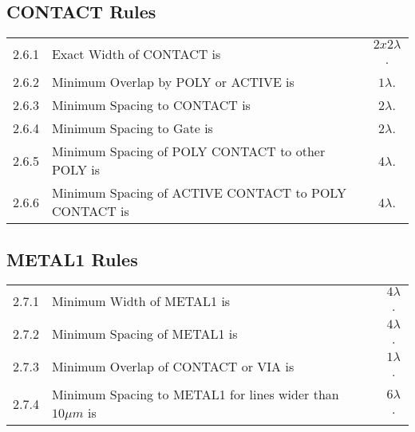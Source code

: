 \subsection{CONTACT Rules}\label{design_rules_contact_rules}

\begin{flushleft}
    \begin{tabular}{c l c}
        2.6.1   & Exact Width of CONTACT is & $2x2 \lambda$. \\
        2.6.2   & Minimum Overlap by POLY or ACTIVE is & $1 \lambda$. \\
        2.6.3   & Minimum Spacing to CONTACT is & $2 \lambda$. \\
        2.6.4   & Minimum Spacing to Gate is & $2 \lambda$. \\
        2.6.5   & Minimum Spacing of POLY CONTACT to other POLY is & $4 \lambda$. \\
        2.6.6   & Minimum Spacing of ACTIVE CONTACT to POLY CONTACT is & $4 \lambda$. \\
    \end{tabular}
\end{flushleft}

\subsection{METAL1 Rules}\label{design_rules_metal1_rules}

\begin{center}
\end{center}

\begin{flushleft}
    \begin{tabular}{c l c}
        2.7.1   & Minimum Width of METAL1 is & $4 \lambda$. \\
        2.7.2   & Minimum Spacing of METAL1 is & $4 \lambda$. \\
        2.7.3   & Minimum Overlap of CONTACT or VIA is & $1 \lambda$. \\
        2.7.4   & Minimum Spacing to METAL1 for lines wider than $10 \mu m$ is & $6 \lambda$. \\
    \end{tabular}
\end{flushleft}

